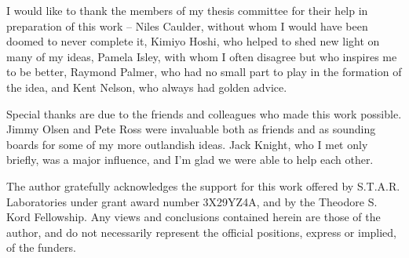 
\begin{acknowledgments}

I would like to thank the members of my thesis committee for their help in preparation of this work -- Niles Caulder, without whom I would have been doomed to never complete it, Kimiyo Hoshi, who helped to shed new light on many of my ideas, Pamela Isley, with whom I often disagree but who inspires me to be better, Raymond Palmer, who had no small part to play in the formation of the idea, and Kent Nelson, who always had golden advice.

Special thanks are due to the friends and colleagues who made this work possible. Jimmy Olsen and Pete Ross were invaluable both as friends and as sounding boards for some of my more outlandish ideas. Jack Knight, who I met only briefly, was a major influence, and I'm glad we were able to help each other. 

The author gratefully acknowledges the support for this work offered by S.T.A.R. Laboratories under grant award number 3X29YZ4A, and by the Theodore S. Kord Fellowship. Any views and conclusions contained herein are those of the author, and do not necessarily represent the official positions, express or implied, of the funders.

\end{acknowledgments}
